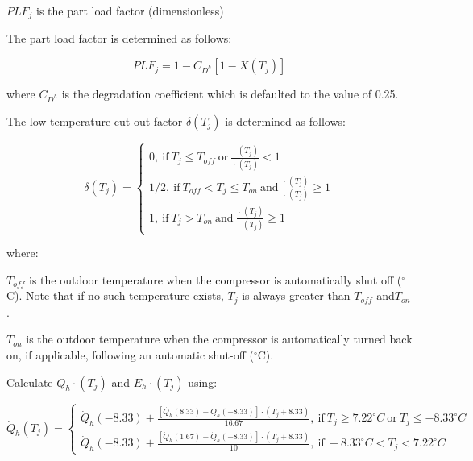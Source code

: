 \(PL{F_j}\) is the part load factor (dimensionless)

The part load factor is determined as follows:

\begin{equation}
PL{F_j} = 1 - {C_{{D^h}}}[1 - X({T_j})]
\end{equation}

where \({C_{{D^h}}}\) is the degradation coefficient which is defaulted to the value of 0.25.

The low temperature cut-out factor \(\delta ({T_j})\) is determined as follows:

\begin{equation}
\delta ({T_j}) = \left\{
    \begin{array}{l}
      {\mathrm{0,~if~}}{T_j} \le {T_{off}}{\mathrm{~or~}}\frac{{\mathop {{Q_h}}\limits^ \cdot  ({T_j})}}{{\mathop {{E_h}}\limits^ \cdot  ({T_j})}} < 1 \\
      {\mathrm{1/2,~if~}}{T_{off}} < {T_j} \le {T_{on}}{\mathrm{~and~}}\frac{{\mathop {{Q_h}}\limits^ \cdot  ({T_j})}}{{\mathop {{E_h}}\limits^ \cdot  ({T_j})}} \ge 1 \\
      {\mathrm{1,~if~}}{T_j} > {T_{on}}{\mathrm{~and~}}\frac{{\mathop {{Q_h}}\limits^ \cdot  ({T_j})}}{{\mathop {{E_h}}\limits^ \cdot  ({T_j})}} \ge 1
    \end{array}
  \right.
\end{equation}

where:

\({T_{off}}\) is the outdoor temperature when the compressor is automatically shut off (\(^{\circ}\)C). Note that if no such temperature exists, \({T_j}\) is always greater than \({T_{off}}\) and\({T_{on}}\).

\({T_{on}}\) is the outdoor temperature when the compressor is automatically turned back on, if applicable, following an automatic shut-off (\(^{\circ}\)C).

Calculate \(\dot{Q}_{h} \cdot ({T_j})\) and \(\dot{E}_{h} \cdot ({T_j})\) using:

\begin{equation}
\dot{Q}_{h}({T_j}) = \left\{ \begin{array}{l}\dot{Q}_{h}(-8.33) + \frac{{\left[ {\dot{{Q}_{h}}(8.33) - \dot{{Q_h}}(-8.33)} \right] \cdot \left( {{T_j} + 8.33} \right)}}{{16.67}}{\mathrm{,~if~}}{T_j} \ge 7.22^{\circ}C {\mathrm{~or~}}{T_j} \le  -8.33^{\circ}C \\
\dot{Q}_{h}(-8.33) + \frac{{\left[ {\dot{Q}_{h}(1.67) - \dot{Q}_{h}(-8.33)} \right] \cdot \left( {{T_j} + 8.33} \right)}}{{10}}{\mathrm{,~if~}} -8.33^{\circ}C < {T_j} < 7.22^{\circ}C\end{array} \right.
\end{equation}

